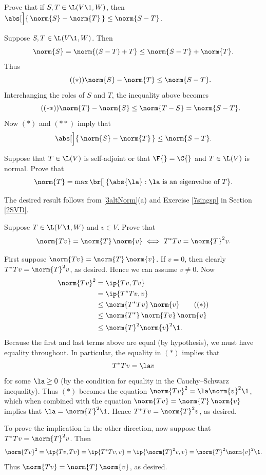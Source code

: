
\exercise
Prove that if $S, T \in \L(V\1, W)$, then $\abs[\Big]{\, \norm{S} - \norm{T} \,} \le \norm{S-T}$. \label{5reverse}

\begin{Solution}
Suppose $S, T \in \L(V\1, W)$. Then
\[
\norm{S} = \norm{(S-T) + T} \le \norm{S-T} + \norm{T}.
\]
Thus
\[ \tag{$(*)$}
\norm{S} - \norm{T} \le \norm{S-T}.
\]
Interchanging the roles of $S$ and $T$, the inequality above becomes
\[ \tag{$(**)$}
\norm{T} - \norm{S} \le \norm{T-S} = \norm{S-T}.
\]
Now $(*)$ and $(**)$ imply that
\[
\abs[\Big]{\, \norm{S} - \norm{T} \,} \le \norm{S-T}.
\]
\end{Solution}

\exercise
Suppose that $T \in \L(V)$ is self-adjoint or that $\F{}= \C{}$ and $T \in \L(V)$ is normal. Prove that
\[
\norm{T} = \max \br[\big]{ \abs{\la} : \la \text{ is an eigenvalue of } T}.
\]
\exercisedisplayend

\begin{Solution}
The desired result follows from \ref{3altNorm}(a) and Exercise \ref{7singsp} in Section \ref{2SVD}.
\end{Solution}

\exercise
Suppose $T \in \L(V\1, W)$ and $v \in V$. Prove that\label{7eq}
\[
\norm{Tv} = \norm{T} \, \norm{v} \iff T^*T v = \norm{T}^2 v.
\]
\exercisedisplayend

\begin{Solution}
First suppose $\norm{Tv} = \norm{T} \, \norm{v}$. If $v = 0$, then clearly $T^*T v = \norm{T}^2 v$, as desired. Hence we can assume
$v \ne 0$. Now
\begin{align*}
\norm{Tv}^2 &= \ip{Tv, Tv} \\
&= \ip{ T^* T v, v} \\
&\le \norm{T^*Tv} \, \norm{v} \tag{$(*)$} \\
&\le \norm{T^*} \, \norm{Tv} \, \norm{v}\\
&\le \norm{T}^2 \norm{v}^2\1.
\end{align*}
Because the first and last terms above are equal (by hypothesis), we must have equality throughout. In particular, the equality in $(*)$ implies that
\[
T^* T v = \la v
\]
for some $\la \ge 0$ (by the condition for equality in the Cauchy--Schwarz inequality). Thus $(*)$ becomes the equation $\norm{Tv}^2 = \la \norm{v}^2\1$, which when combined with the equation $\norm{Tv} = \norm{T} \, \norm{v}$ implies that $\la = \norm{T}^2\1$. Hence
$T^*T v = \norm{T}^2 v$, as desired.

To prove the implication in the other direction, now suppose that $T^*T v = \norm{T}^2 v$. Then
\[
\norm{Tv}^2 = \ip{Tv, Tv} = \ip{T^* Tv, v} = \ip{\norm{T}^2 v, v} = \norm{T}^2 \norm{v}^2\1.
\]
Thus $\norm{Tv} = \norm{T} \, \norm{v}$, as desired.
\end{Solution}

